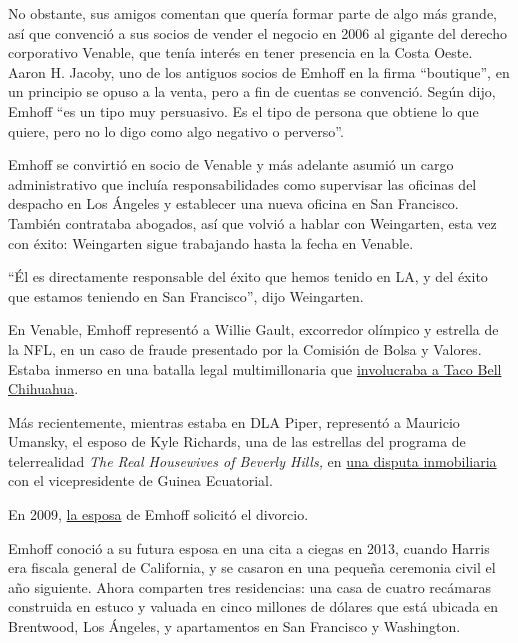 No obstante, sus amigos comentan que quería formar parte de algo más
grande, así que convenció a sus socios de vender el negocio en 2006 al
gigante del derecho corporativo Venable, que tenía interés en tener
presencia en la Costa Oeste. Aaron H. Jacoby, uno de los antiguos socios
de Emhoff en la firma ``boutique'', en un principio se opuso a la venta,
pero a fin de cuentas se convenció. Según dijo, Emhoff ``es un tipo muy
persuasivo. Es el tipo de persona que obtiene lo que quiere, pero no lo
digo como algo negativo o perverso''.

Emhoff se convirtió en socio de Venable y más adelante asumió un cargo
administrativo que incluía responsabilidades como supervisar las
oficinas del despacho en Los Ángeles y establecer una nueva oficina en
San Francisco. También contrataba abogados, así que volvió a hablar con
Weingarten, esta vez con éxito: Weingarten sigue trabajando hasta la
fecha en Venable.

``Él es directamente responsable del éxito que hemos tenido en LA, y del
éxito que estamos teniendo en San Francisco'', dijo Weingarten.

En Venable, Emhoff representó a Willie Gault, excorredor olímpico y
estrella de la NFL, en un caso de fraude presentado por la Comisión de
Bolsa y Valores. Estaba inmerso en una batalla legal multimillonaria que
\href{https://www.businessinsider.com/doug-emhoff-kamala-harriss-husband-taco-bell-chihuahua-case-2020-8}{involucraba
a Taco Bell Chihuahua}.

Más recientemente, mientras estaba en DLA Piper, representó a Mauricio
Umansky, el esposo de Kyle Richards, una de las estrellas del programa
de telerrealidad \emph{The Real Housewives of Beverly Hills,} en
\href{https://therealdeal.com/la/2019/07/24/my-husband-did-not-scam-anyone-kyle-richards-on-mauricio-umanskys-legal-woes-on-real-housewives-ep/}{una
disputa inmobiliaria} con el vicepresidente de Guinea Ecuatorial.

En 2009,
\href{https://www.nytimes3xbfgragh.onion/2020/08/19/us/politics/second-gentleman-doug-emhoff.html}{la
esposa} de Emhoff solicitó el divorcio.

Emhoff conoció a su futura esposa en una cita a ciegas en 2013, cuando
Harris era fiscala general de California, y se casaron en una pequeña
ceremonia civil el año siguiente. Ahora comparten tres residencias: una
casa de cuatro recámaras construida en estuco y valuada en cinco
millones de dólares que está ubicada en Brentwood, Los Ángeles, y
apartamentos en San Francisco y Washington.

